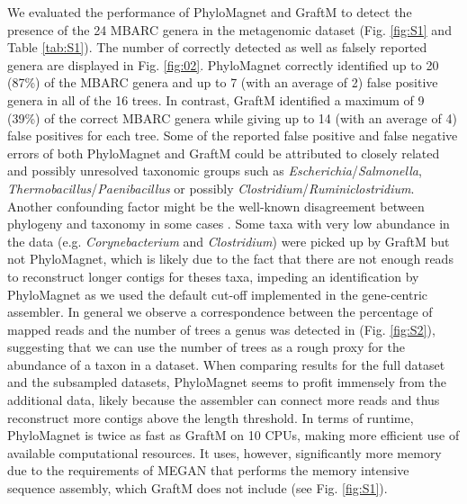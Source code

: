 \documentclass{bioinfo}
\begin{document}
We evaluated the performance of PhyloMagnet and GraftM to detect the presence of the 24 MBARC genera \citep[23 of those detectable, as Nocardiopsis was part of the pooled community but not present in the sequence data from][]{Singer2016} in the metagenomic dataset (Fig. \ref{fig:S1} and Table \ref{tab:S1}). The number of correctly detected as well as falsely reported genera are displayed in Fig. \ref{fig:02}. PhyloMagnet correctly identified up to 20 (87\%) of the MBARC genera and up to 7 (with an average of 2) false positive genera in all of the 16 trees. In contrast, GraftM identified a maximum of 9 (39\%) of the correct MBARC genera while giving up to 14 (with an average of 4) false positives for each tree. Some of the reported false positive and false negative errors of both PhyloMagnet and GraftM could be attributed to closely related and possibly unresolved taxonomic groups such as \textit{Escherichia}/\textit{Salmonella}, \textit{Thermobacillus}/\textit{Paenibacillus} or possibly \textit{Clostridium}/\textit{Ruminiclostridium}. Another confounding factor might be the well-known disagreement between phylogeny and taxonomy in some cases \citep[e.g. \textit{Escherichia}/\textit{Salmonella};][]{Retchless2010}.  Some taxa with very low abundance in the data (e.g. \textit{Corynebacterium} and \textit{Clostridium}) were picked up by GraftM but not PhyloMagnet, which is likely due to the fact that there are not enough reads to reconstruct longer contigs for theses taxa, impeding an identification by PhyloMagnet as we used the default cut-off implemented in the gene-centric assembler. In general we observe a correspondence between the percentage of mapped reads \citep{Singer2016} and the number of trees a genus was detected in (Fig. \ref{fig:S2}), suggesting that we can use the number of trees as a rough proxy for the abundance of a taxon in a dataset.  
When comparing results for the full dataset and the subsampled datasets, PhyloMagnet seems to profit immensely from the additional data, likely because the assembler can connect more reads and thus reconstruct more contigs above the length threshold.
In terms of runtime, PhyloMagnet is twice as fast as GraftM on 10 CPUs, making more efficient use of available computational resources. It uses, however, significantly more memory due to the requirements of MEGAN that performs the memory intensive sequence assembly, which GraftM does not include (see Fig. \ref{fig:S1}).
\end{document}
